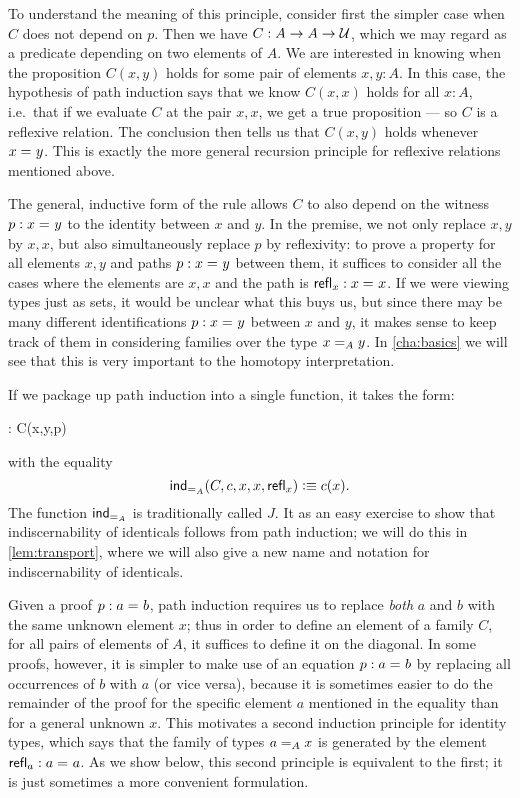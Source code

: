To understand the meaning of this principle, consider first the simpler case when $C$
does not depend on $p$.  Then we have $C:A\to A\to \UU$, which we may
regard as a predicate depending on two elements of $A$.  We are
interested in knowing when the proposition $C(x,y)$ holds for some pair
of elements $x,y:A$.  In this case, the hypothesis of path induction
says that we know $C(x,x)$ holds for all $x:A$, i.e.\ that if we
evaluate $C$ at the pair $x, x$, we get a true proposition --- so $C$ is
a reflexive relation.  The conclusion then tells us that $C(x,y)$ holds
whenever $\id{x}{y}$.  This is exactly the more general recursion principle
for reflexive relations mentioned above.

The general, inductive form of the rule allows $C$ to also depend on the witness $p:\id{x}{y}$ to the identity between $x$ and $y$.  In the premise, we not only replace $x, y$ by $x,x$, but also simultaneously replace $p$ by reflexivity: to prove a property for all elements $x,y$ and paths $p : \id{x}{y}$ between them, it suffices to consider all the cases where the elements are $x,x$ and the path is $\refl{x}: \id{x}{x}$.  If we were viewing types just as sets, it would be unclear what this buys us, but since there may be many different identifications $p : \id{x}{y}$ between $x$ and $y$, it makes sense to keep track of them in considering families over the type $\id[A]{x}{y}$.
In \cref{cha:basics} we will see that this is very important to the homotopy interpretation.

If we package up path induction into a single function, it takes the form:
%
\begin{narrowmultline*}
   :  
   \to 
  \narrowbreak
     C(x,y,p)
\end{narrowmultline*}
with the equality
\[ \indid{A}(C,c,x,x,\refl{x}) \defeq c(x). \]
The function $ \indid{A}$ is traditionally called $J$.
%
It as an easy exercise to show that indiscernability of identicals follows from path induction; we will do this in \autoref{lem:transport}, where we will also give a new name and notation for indiscernability of identicals.

\mentalpause

Given a proof $p : \id{a}{b}$,
path induction requires us to replace \emph{both} $a$ and $b$ with the same unknown element $x$; thus in order to define an element of a family
$C$, for all pairs of elements of $A$, it suffices to define it on the diagonal.
In some proofs, however, it is simpler to make use of an equation $p : \id{a}{b}$ by replacing all occurrences of $b$ with $a$ (or vice versa), because it is sometimes easier to do the remainder of the proof for the specific element $a$ mentioned in the equality than for a general unknown $x$.  This motivates a second induction principle for identity types, which says that the family of types $\id[A]{a}{x}$ is generated by the element $\refl{a} : \id{a}{a}$.  As we show below, this second principle is equivalent to the first; it is just sometimes a more convenient formulation.

